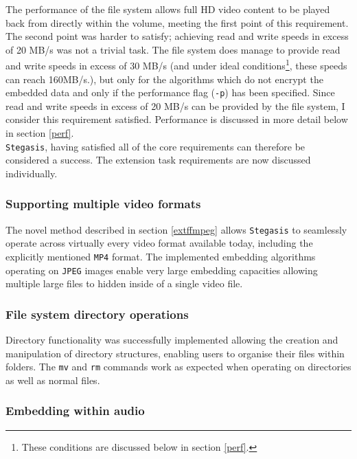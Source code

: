 \documentclass[paper=a4, fontsize=11pt,twoside]{scrartcl}
\numberwithin{table}{section}
\numberwithin{figure}{section}
\numberwithin{algorithm}{section}
\begin{document}
The performance of the file system allows full HD video content to be played back from directly within the volume, meeting the first point of this requirement. The second point was harder to satisfy; achieving read and write speeds in excess of 20 MB/s was not a trivial task. The file system does manage to provide read and write speeds in excess of 30 MB/s (and under ideal conditions\footnote{These conditions are discussed below in section \ref{perf}.}, these speeds can reach 160MB/s.), but only for the algorithms which do not encrypt the embedded data and only if the performance flag (\texttt{-p}) has been specified. Since read and write speeds in excess of 20 MB/s can be provided by the file system, I consider this requirement satisfied. Performance is discussed in more detail below in section \ref{perf}.\\

\noindent
\texttt{Stegasis}, having satisfied all of the core requirements can therefore be considered a success. The extension task requirements are now discussed individually. 

\subsubsection{Supporting multiple video formats}

The novel method described in section \ref{extffmpeg} allows \texttt{Stegasis} to seamlessly operate across virtually every video format available today, including the explicitly mentioned \texttt{MP4} format. The implemented embedding algorithms operating on \texttt{JPEG} images enable very large embedding capacities allowing multiple large files to hidden inside of a single video file.

\subsubsection{File system directory operations}

Directory functionality was successfully implemented allowing the creation and manipulation of directory structures, enabling users to organise their files within folders. The \texttt{mv} and \texttt{rm} commands work as expected when operating on directories as well as normal files. 

\subsubsection{Embedding within audio}
\end{document}
